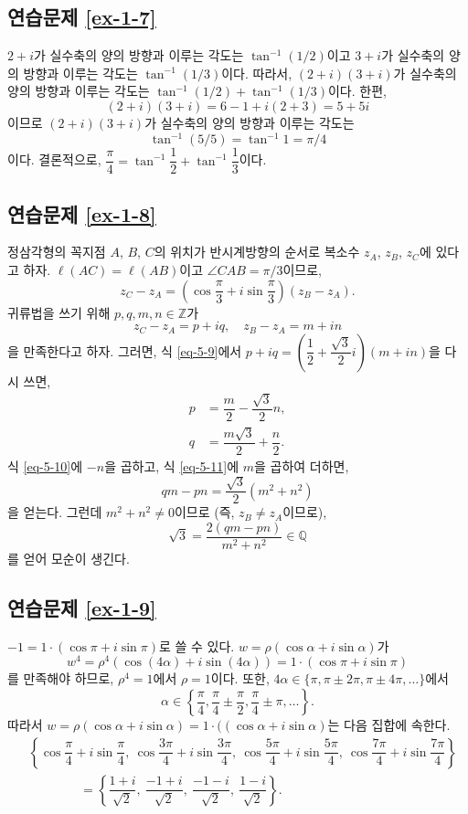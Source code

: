 \subsection*{연습문제 \ref{ex-1-7}}

$2+i$가 실수축의 양의 방향과 이루는 각도는 $\tan^{-1}(1/2)$이고
$3+i$가 실수축의 양의 방향과 이루는 각도는 $\tan^{-1}(1/3)$이다.
따라서, $(2+i)(3+i)$가 실수축의 양의 방향과 이루는 각도는 
$\tan^{-1}(1/2) + \tan^{-1}(1/3)$이다.
한편,
\[
(2+i)(3+i) = 6 - 1 + i(2+3) = 5 + 5i
\]
이므로 $(2+i)(3+i)$가  실수축의 양의 방향과 이루는 각도는
\[
\tan^{-1} (5/5) = \tan^{-1} 1 = \pi/4
\]
이다. 결론적으로, 
$\dfrac\pi4 = \tan^{-1}\dfrac12 + \tan^{-1}\dfrac13$이다.

\subsection*{연습문제 \ref{ex-1-8}}

정삼각형의 꼭지점  $A$, $B$, $C$의 위치가 
반시계방향의 순서로 복소수 $z_A$, $z_B$, $z_C$에 있다고 하자.
$\ell(AC) = \ell(AB)$이고 $\angle CAB=\pi/3$이므로,
\begin{equation}\label{eq-5-9}
z_C - z_A = \left( \cos\dfrac\pi3 + i\sin\dfrac\pi3 \right)(z_B - z_A).
\end{equation}
귀류법을 쓰기 위해 $p,q,m,n\in\mathbb Z$가 
\[
z_C - z_A = p+iq, \quad
z_B - z_A = m+in
\]
을 만족한다고  하자.
그러면, 식 \eqref{eq-5-9}에서
$p+iq = \left(\dfrac12 + \dfrac{\sqrt{3}}2i\right)(m+in)$을 다시 쓰면,
\begin{align}
p &= \dfrac m2 - \dfrac{\sqrt{3}}2n, \label{eq-5-10} \\
q &= \dfrac{m\sqrt{3}}2 + \dfrac n2. \label{eq-5-11}
\end{align}
식 \eqref{eq-5-10}에 $-n$을 곱하고,
식 \eqref{eq-5-11}에 $m$을 곱하여 더하면,
\[
qm - pn = \dfrac{\sqrt{3}}2 (m^2 + n^2)
\]
을 얻는다.
그런데 $m^2+n^2 \ne0$이므로 (즉, $z_B \ne z_A$이므로),
\[
\sqrt{3} = \dfrac{2(qm-pn)}{m^2+n^2} \in \mathbb Q
\]
를 얻어 모순이 생긴다.

\subsection*{연습문제 \ref{ex-1-9}}

$-1 = 1 \cdot (\cos \pi + i \sin \pi)$로 쓸 수 있다.
$w = \rho(\cos\alpha + i\sin\alpha)$가 
\[
w^4 = \rho^4(\cos(4\alpha) + i\sin(4\alpha)) = 1 \cdot (\cos \pi + i \sin \pi)
\]
를 만족해야 하므로,
$\rho^4 = 1$에서 $\rho=1$이다.
또한, $4\alpha \in \{ \pi, \pi\pm2\pi, \pi\pm4\pi, \ldots\}$에서
\[
\alpha \in \left\{ \dfrac\pi4, \dfrac\pi4\pm\dfrac\pi2, \dfrac\pi4\pm\pi,\ldots
\right\}.
\]
따라서 $ w = \rho(\cos\alpha + i\sin\alpha) = 1\cdot((\cos\alpha + i\sin\alpha) $는
다음 집합에 속한다.
\begin{align*}
&\left\{ \cos\dfrac\pi4+i\sin\dfrac\pi4,\ \cos\dfrac{3\pi}4+i\sin\dfrac{3\pi}4, \
\cos\dfrac{5\pi}4+i\sin\dfrac{5\pi}4, \ \cos\dfrac{7\pi}4+i\sin\dfrac{7\pi}4
\right\} \\
&\qquad\quad\quad = \left\{ \dfrac{1+i}{\sqrt{2}},  \ \dfrac{-1+i}{\sqrt{2}}, \
 \dfrac{-1-i}{\sqrt{2}}, \ \dfrac{1-i}{\sqrt{2}} \right\}.
\end{align*}

